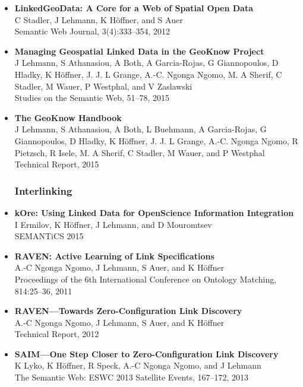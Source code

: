 \documentclass[a4paper,11pt]{article}
\begin{document}
\begin{itemize}
\item \textbf{LinkedGeoData: A Core for a Web of Spatial Open Data}~\\
C Stadler, J Lehmann, K Höffner, and S Auer\\
Semantic Web Journal, 3(4):333--354, 2012

\item \textbf{Managing Geospatial Linked Data in the GeoKnow Project}~\\
J Lehmann, S Athanasiou, A Both, A Garcia-Rojas, G Giannopoulos,
D Hladky, K Höffner, J. J. L Grange, A.-C. Ngonga Ngomo, M. A Sherif, C Stadler,
M Wauer, P Westphal, and V Zaslawski\\
Studies on the Semantic Web, 51--78, 2015

\item \textbf{The GeoKnow Handbook}~\\
J Lehmann, S Athanasiou, A Both, L Buehmann, A Garcia-Rojas, G Giannopoulos, D Hladky, K Höffner, J. J. L Grange, A.-C. Ngonga Ngomo, R Pietzsch, R Isele, M. A Sherif, C Stadler, M Wauer, and P Westphal\\
Technical Report, 2015


\subsubsection*{Interlinking}

\item \textbf{kOre: Using Linked Data for OpenScience Information Integration}~\\
I Ermilov, K Höffner, J Lehmann, and D Mouromtsev\\
SEMANTiCS 2015%

\item \textbf{RAVEN: Active Learning of Link Specifications}~\\
A.-C Ngonga Ngomo, J Lehmann, S Auer, and K Höffner\\
Proceedings of the 6th International Conference on Ontology Matching,\\
814:25--36, 2011

\item \textbf{RAVEN---Towards Zero-Configuration Link Discovery}~\\
A.-C Ngonga Ngomo, J Lehmann, S Auer, and K Höffner\\
Technical Report, 2012

\item \textbf{SAIM---One Step Closer to Zero-Configuration Link Discovery}~\\
K Lyko, K Höffner, R Speck, A.-C Ngonga Ngomo, and J Lehmann\\
The Semantic Web: ESWC 2013 Satellite Events, 167--172, 2013


\end{itemize}
\end{document}
